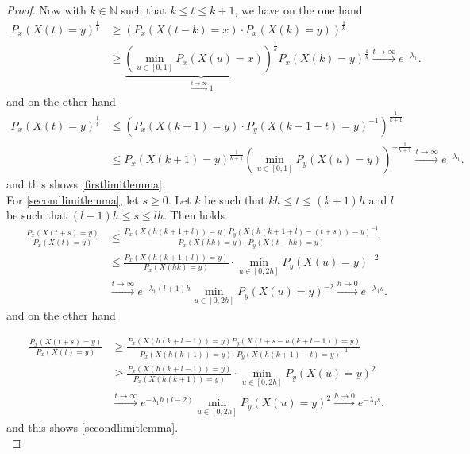 \documentclass[12pt,a4paper]{scrartcl}
\numberwithin{equation}{section}
\newcommand{\N}{\mathbb{N}} %
\begin{document}
\begin{proof}
Now with $k \in \N$ such that $ k \leq t \leq k+1 $, we have on the one hand
\begin{align*}
P_x\left(X\left(t\right)=y \right)^{\frac{1}{t}} &\geq \left(P_x\left(X\left(t - k\right)=x \right)\cdot P_x\left(X\left(k\right) = y\right) \right)^{\frac{1}{k}} \\
&\geq \underbrace{\left(\min_{u \in \left[0,1\right]}P_x\left(X\left(u\right)=x\right)\right)^{\frac{1}{k}}}_{\overset{t \to \infty}{\to} 1} P_x\left(X\left(k\right) = y\right)^{\frac{1}{k}} \overset{t \to \infty}{\to} e^{-\lambda_1}.
\end{align*}
and on the other hand
\begin{align*}
P_x\left(X\left(t\right)=y \right)^{\frac{1}{t}} &\leq \left(P_x\left(X\left(k+1\right)=y \right) \cdot P_y\left(X\left(k+1-t\right)=y \right)^{-1} \right)^{\frac{1}{k+1}} \\
&\leq P_x\left(X\left(k+1\right)=y \right)^{\frac{1}{k+1}} \left(\min_{u \in \left[0,1\right]}P_y\left(X\left(u\right) = y \right)\right)^{-\frac{1}{k+1}} \overset{t \to \infty}{\to} e^{-\lambda_1}.
\end{align*}
and this shows \eqref{firstlimitlemma}. \\[3ex]
For \eqref{secondlimitlemma}, let $s \geq 0$. Let $k$ be such that $kh \leq t \leq \left(k+1\right)h$ and $l$ be such that $\left(l-1\right)h \leq s\leq lh.$ Then holds
\begin{align*}
\frac{P_x\left(X\left(t+s\right)=y\right)}{P_x\left(X\left(t\right)=y\right)} &\leq \frac{P_x\left(X\left(h\left(k+1+l\right)\right)=y \right) P_y\left(X\left(h\left(k+1+l\right)-\left(t+s\right)\right)=y\right)^{-1} }{P_x\left(X\left(hk\right)=y\right)\cdot P_y\left(X\left(t-hk\right)=y\right)} \\
&\leq \frac{P_x\left(X\left(h\left(k+1+l\right)\right)=y \right)}{P_x\left(X\left(hk\right)=y\right)} \cdot \min_{u \in \left[0,2h\right]} P_y\left(X\left(u\right)=y \right)^{-2} \\
& \overset{t \to \infty}{\to} e^{-\lambda_1 \left(l+1\right) h} \min_{u \in \left[0,2h\right]} P_y\left(X\left(u\right)=y \right)^{-2} \overset{h \to 0}{\to} e^{-\lambda_1 s}.
\end{align*}
and on the other hand

\begin{align*}
\frac{P_x\left(X\left(t+s\right)=y\right)}{P_x\left(X\left(t\right)=y\right)} &\geq \frac{ P_x\left(X\left(h\left(k+l-1\right)\right)=y \right) P_y\left(X\left(t+s-h\left(k+l-1\right)\right)=y\right)}{P_x\left(X\left(h\left(k+1\right)\right)=y\right)\cdot P_y\left(X\left(h\left(k+1\right)-t\right)=y\right)^{-1}} \\ 
&\geq \frac{P_x\left(X\left(h\left(k+l-1\right)\right)=y \right)}{P_x\left(X\left(h\left(k+1\right)\right)=y\right)} \cdot \min_{u \in \left[0,2h\right]} P_y\left(X\left(u\right)=y\right)^2 \\
& \overset{t \to \infty}{\to} e^{-\lambda_1 h \left(l-2\right)} \min_{u \in \left[0,2h\right]} P_y\left(X\left(u\right)=y\right)^2 \overset{h \to 0}{\to} e^{-\lambda_1 s}.
\end{align*}
and this shows \eqref{secondlimitlemma}. \\[2ex]


\end{proof}
\end{document}
